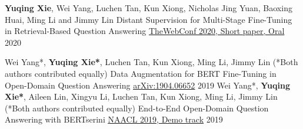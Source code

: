 

\begin{cventries}

\cventry
    {\textbf{Yuqing Xie}, Wei Yang, Luchen Tan, Kun Xiong, Nicholas Jing Yuan, Baoxing Huai, Ming Li and Jimmy Lin}
    {Distant Supervision for Multi-Stage Fine-Tuning in Retrieval-Based Question Answering} %
    {\underline{TheWebConf 2020, Short paper, Oral}} %
    {2020} %
    {
    }
    
\cventry
    {Wei Yang*, \textbf{Yuqing Xie*}, Luchen Tan, Kun Xiong, Ming Li, Jimmy Lin (*Both authors contributed equally)}
    {Data Augmentation for BERT Fine-Tuning in Open-Domain Question Answering} %
    {{\href{https://arxiv.org/abs/1904.06652}{\underline{arXiv:1904.06652}}}} %
    {2019} %
    {
    }
\cventry
    {Wei Yang*, \textbf{Yuqing Xie*}, Aileen Lin, Xingyu Li, Luchen Tan, Kun Xiong, Ming Li, Jimmy Lin (*Both authors contributed equally)}
    {End-to-End Open-Domain Question Answering with BERTserini} %
    {{\href{https://www.aclweb.org/anthology/N19-4013/}{\underline{NAACL 2019, Demo track}}}} %
    {2019} %
    {
    }

\end{cventries}
